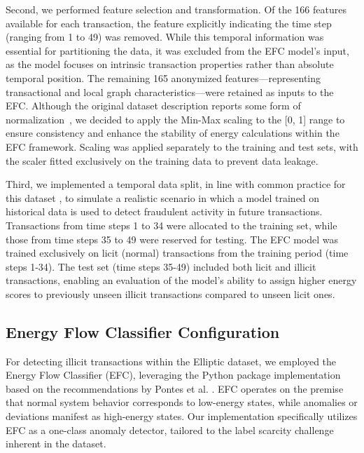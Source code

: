 \documentclass[12pt]{article}
\begin{document}
Second, we performed feature selection and transformation. Of the 166 features available for each transaction, the feature
explicitly indicating the time step (ranging from 1 to 49) was removed. While this temporal information was essential for
partitioning the data, it was excluded from the EFC model's input, as the model focuses on intrinsic transaction properties
rather than absolute temporal position. The remaining 165 anonymized features---representing transactional and local graph
characteristics---were retained as inputs to the EFC. Although the original dataset description reports some form of
normalization~\cite{weber2019antimoneylaunderingbitcoinexperimenting}, we decided to apply the Min-Max scaling to the
[0, 1] range to ensure consistency and enhance the stability of energy calculations within the EFC framework. Scaling was
applied separately to the training and test sets, with the scaler fitted exclusively on the training data to prevent data leakage.

Third, we implemented a temporal data split, in line with common practice for this dataset 
\cite{weber2019antimoneylaunderingbitcoinexperimenting, lorenz2021machinelearningmethodsdetect}, to simulate a realistic
scenario in which a model trained on historical data is used to detect fraudulent activity in future transactions.
Transactions from time steps 1 to 34 were allocated to the training set, while those from time steps 35 to 49 were reserved
for testing. The EFC model was trained exclusively on licit (normal) transactions from the training period (time steps 1-34).
The test set (time steps 35-49) included both licit and illicit transactions, enabling an evaluation of the model's ability
to assign higher energy scores to previously unseen illicit transactions compared to unseen licit ones.

\subsection{Energy Flow Classifier Configuration} \label{subsec:efc_implementation}

For detecting illicit transactions within the Elliptic dataset, we employed the Energy Flow Classifier (EFC), leveraging
the Python package implementation \cite{efc_package_github} based on the recommendations by Pontes et al.
\cite{pontes2019,souza2022novelopensetenergybased}. EFC operates on the premise that normal system behavior corresponds
to low-energy states, while anomalies or deviations manifest as high-energy states. Our implementation specifically
utilizes EFC as a one-class anomaly detector, tailored to the label scarcity challenge inherent in the dataset.
\end{document}
